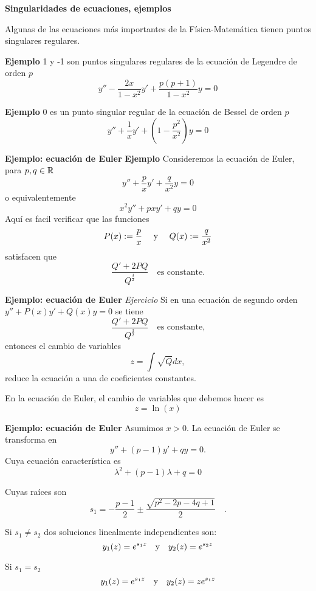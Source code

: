 \begin{frame}{\textbf{Singularidades de ecuaciones, ejemplos}}


Algunas de las ecuaciones más importantes de la Física-Matemática tienen puntos singulares regulares.

\textbf{Ejemplo } 1 y -1 son puntos singulares regulares de la ecuación de Legendre de orden $p$
\[y''-\frac{2x}{1-x^2}y'+\frac{p(p+1)}{1-x^2}y=0\]



\textbf{Ejemplo } 0 es un punto singular regular de la ecuación de Bessel de orden $p$
\[y''+\frac{1}{x}y'+\left(1-\frac{p^2}{x^2}\right)y=0\]




\end{frame}

\begin{frame}{\textbf{Ejemplo: ecuación de Euler}}
\textbf{Ejemplo } Consideremos la ecuación de Euler, para $p,q\in\mathbb{R}$
\[y''+\frac{p}{x}y'+\frac{q}{x^2}y=0\]
o equivalentemente
\[x^2y''+pxy'+qy=0\]
Aquí es facil verificar que las funciones
\[P(x):=\frac{p}{x}\quad\hbox{ y }\quad Q(x):= \frac{q}{x^2}\]
satisfacen que
\[\frac{Q'+2PQ}{Q^{\frac{3}{2}}}\quad\text{es constante.}\]


\end{frame}

\begin{frame}[fragile]{\textbf{Ejemplo: ecuación de Euler}}
\emph{Ejercicio} Si en una ecuación de segundo orden $y''+P(x)y'+Q(x)y=0$
se tiene
\[\frac{Q'+2PQ}{Q^{\frac{3}{2}}}\quad\text{es constante,}\]
entonces el cambio de variables 
\[z=\int\sqrt{Q}dx,\]
 reduce la ecuación a una de coeficientes constantes.
 
 
En la ecuación de Euler, el cambio de variables que debemos hacer es
\[z=\ln(x)\]



\end{frame}

\begin{frame}[fragile]{\textbf{Ejemplo: ecuación de Euler}}
Asumimos $x>0$. La ecuación de Euler se transforma en
\[y''+(p-1)y'+qy=0.\]
Cuya ecuación característica es
\[\lambda^2+(p-1)\lambda+q=0\]


Cuyas raíces son 
\[s_1= -\frac{p-1}{2} \pm \frac{\sqrt{p^2 - 2p - 4q + 1}}{2}   \quad .\]

 Si $s_1\neq s_2$ dos soluciones linealmente independientes son:
\[y_1(z)=e^{s_1z}\quad\hbox{y}\quad y_2(z)=e^{s_2z}\]

 Si $s_1=s_2$
\[y_1(z)=e^{s_1z} \quad\hbox{y}\quad y_2(z)=ze^{s_1z}\]
 

\end{frame}

